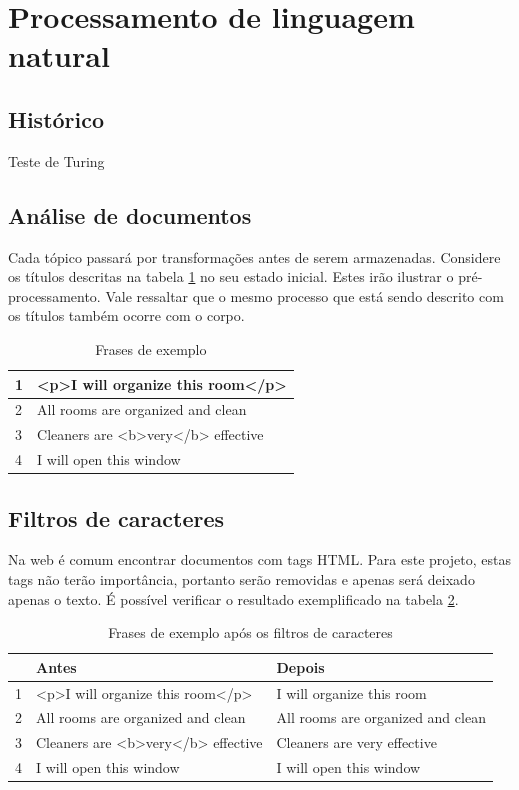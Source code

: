 \section{Processamento de linguagem natural}
\subsection{Histórico}
Teste de Turing
\subsection{Análise de documentos}
Cada tópico passará por transformações antes de serem armazenadas. Considere os títulos descritas na tabela \ref{tab:example} no seu estado inicial. Estes irão ilustrar o pré-processamento. Vale ressaltar que o mesmo processo que está sendo descrito com os títulos também ocorre com o corpo.

\begin{table}[htb]
	\centering
    \def\arraystretch{1.2} %
    \begin{tabular}{|l|l|}
        \hline
        1 & <p>I will organize this room</p>            \\ \hline
        2 & All rooms are organized and clean \\ \hline
        3 & Cleaners are <b>very</b> effective                              \\ \hline
        4 & I will open this window                            \\ \hline
    \end{tabular}
	\caption{Frases de exemplo}
    \label{tab:example}
\end{table}


\subsection{Filtros de caracteres}
Na web é comum encontrar documentos com tags HTML. Para este projeto, estas tags não terão importância, portanto serão removidas e apenas será deixado apenas o texto. É possível verificar o resultado exemplificado na tabela \ref{tab:charfilter}.

\begin{table}[htb]
	\centering
    \def\arraystretch{1.2} %
    \begin{tabular}{|l|l|l|}
        \hline
        & \textbf{Antes} & \textbf{Depois} \\ \hline
        1 & <p>I will organize this room</p> & I will organize this room            \\ \hline
        2 & All rooms are organized and clean & All rooms are organized and clean \\ \hline
        3 & Cleaners are <b>very</b> effective & Cleaners are very effective                              \\ \hline
        4 & I will open this window & I will open this window                             \\ \hline
    \end{tabular}
	\caption{Frases de exemplo após os filtros de caracteres}
    \label{tab:charfilter}
\end{table}

